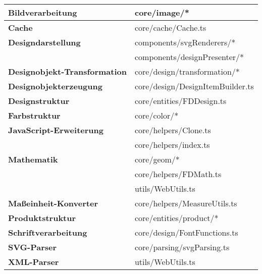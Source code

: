 \begin{tabular}{ll}
\hline
\textbf{Bildverarbeitung} 
& core/image/* \\
\hline
\textbf{Cache} 
& core/cache/Cache.ts \\
\hline
\textbf{Designdarstellung} 
& components/svgRenderers/* \\
& components/designPresenter/* \\
\hline
\textbf{Designobjekt-Transformation}
& core/design/transformation/*	\\
\hline
\textbf{Designobjekterzeugung} 
& core/design/DesignItemBuilder.ts \\
\hline
\textbf{Designstruktur}
& core/entities/FDDesign.ts \\
\hline
\textbf{Farbstruktur}
& core/color/* \\
\hline
\textbf{JavaScript-Erweiterung} 
& core/helpers/Clone.ts \\
& core/helpers/index.ts \\
\hline
\textbf{Mathematik} 
& core/geom/*	               \\ 
& core/helpers/FDMath.ts	   \\ 
& utils/WebUtils.ts	           \\ 
\hline
\textbf{Maßeinheit-Konverter} 
& core/helpers/MeasureUtils.ts \\
\hline
\textbf{Produktstruktur} 
& core/entities/product/*	\\
\hline
\textbf{Schriftverarbeitung} 
& core/design/FontFunctions.ts \\
\hline
\textbf{SVG-Parser}
& core/parsing/svgParsing.ts \\
\hline
\textbf{XML-Parser}
& utils/WebUtils.ts \\
\end{tabular} 

